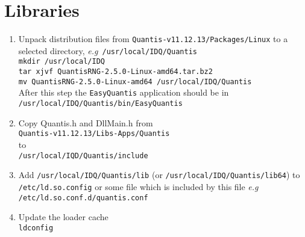 \documentclass[a4paper,11pt]{article}
\newcommand{\eg}{\textsl{e.g}}
\newcommand{\QuantisDistVersion}{Quantis-v11.12.13}
\begin{document}
\section{Libraries}

\begin{enumerate}
    \item Unpack distribution files from
    \texttt{\QuantisDistVersion /Packages/Linux} to a selected directory, \eg\
    \texttt{/usr/local/IDQ/Quantis}\\ \texttt{mkdir /usr/local/IDQ}\\
    \texttt{tar xjvf QuantisRNG-2.5.0-Linux-amd64.tar.bz2}\\ \texttt{mv
    QuantisRNG-2.5.0-Linux-amd64 /usr/local/IDQ/Quantis}\\ After this step the
    \texttt{EasyQuantis} application should be in\\
    \texttt{/usr/local/IDQ/Quantis/bin/EasyQuantis}
    \item Copy {Quantis.h} and {DllMain.h} from\\
    \texttt{\QuantisDistVersion /Libs-Apps/Quantis}\\ to\\
    \texttt{/usr/local/IQD/Quantis/include}
    \item Add \texttt{/usr/local/IDQ/Quantis/lib} (or
    \texttt{/usr/local/IDQ/Quantis/lib64}) to \\ \texttt{/etc/ld.so.config} or
    some file which is included by this file \eg\ \\
    \texttt{/etc/ld.so.conf.d/quantis.conf}
    \item Update the loader cache\\
    \texttt{ldconfig}
\end{enumerate}
\end{document}
